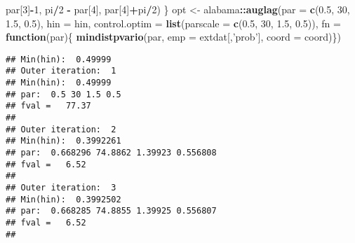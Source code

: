 \documentclass[]{book}
\newenvironment{Shaded}{\begin{snugshade}}{\end{snugshade}}
\newcommand{\ControlFlowTok}[1]{\textcolor[rgb]{0.13,0.29,0.53}{\textbf{#1}}}
\newcommand{\DataTypeTok}[1]{\textcolor[rgb]{0.13,0.29,0.53}{#1}}
\newcommand{\DecValTok}[1]{\textcolor[rgb]{0.00,0.00,0.81}{#1}}
\newcommand{\FloatTok}[1]{\textcolor[rgb]{0.00,0.00,0.81}{#1}}
\newcommand{\KeywordTok}[1]{\textcolor[rgb]{0.13,0.29,0.53}{\textbf{#1}}}
\newcommand{\NormalTok}[1]{#1}
\newcommand{\OperatorTok}[1]{\textcolor[rgb]{0.81,0.36,0.00}{\textbf{#1}}}
\newcommand{\StringTok}[1]{\textcolor[rgb]{0.31,0.60,0.02}{#1}}
\begin{document}
\begin{Shaded}
\begin{Highlighting}[]
\NormalTok{     par[}\DecValTok{3}\NormalTok{]}\OperatorTok{-}\DecValTok{1}\NormalTok{,}
\NormalTok{     pi}\OperatorTok{/}\DecValTok{2} \OperatorTok{-}\StringTok{ }\NormalTok{par[}\DecValTok{4}\NormalTok{],}
\NormalTok{     par[}\DecValTok{4}\NormalTok{]}\OperatorTok{+}\NormalTok{pi}\OperatorTok{/}\DecValTok{2}\NormalTok{)}
\NormalTok{   \}}
\NormalTok{ opt <-}\StringTok{ }\NormalTok{alabama}\OperatorTok{::}\KeywordTok{auglag}\NormalTok{(}\DataTypeTok{par =} \KeywordTok{c}\NormalTok{(}\FloatTok{0.5}\NormalTok{, }\DecValTok{30}\NormalTok{, }\FloatTok{1.5}\NormalTok{, }\FloatTok{0.5}\NormalTok{),}
                        \DataTypeTok{hin =}\NormalTok{ hin, }\DataTypeTok{control.optim =} \KeywordTok{list}\NormalTok{(}\DataTypeTok{parscale =} \KeywordTok{c}\NormalTok{(}\FloatTok{0.5}\NormalTok{, }\DecValTok{30}\NormalTok{, }\FloatTok{1.5}\NormalTok{, }\FloatTok{0.5}\NormalTok{)),}
                         \DataTypeTok{fn =} \ControlFlowTok{function}\NormalTok{(par)\{}
                           \KeywordTok{mindistpvario}\NormalTok{(par, }\DataTypeTok{emp =}\NormalTok{ extdat[,}\StringTok{'prob'}\NormalTok{], }\DataTypeTok{coord =}\NormalTok{ coord)\})}
\end{Highlighting}
\end{Shaded}

\begin{verbatim}
## Min(hin):  0.49999 
## Outer iteration:  1 
## Min(hin):  0.49999 
## par:  0.5 30 1.5 0.5 
## fval =   77.37 
##  
## Outer iteration:  2 
## Min(hin):  0.3992261 
## par:  0.668296 74.8862 1.39923 0.556808 
## fval =   6.52 
##  
## Outer iteration:  3 
## Min(hin):  0.3992502 
## par:  0.668285 74.8855 1.39925 0.556807 
## fval =   6.52 
## 
\end{verbatim}
\end{document}
